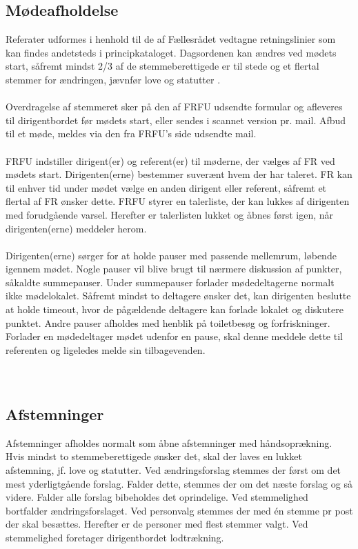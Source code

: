 \subsection{Mødeafholdelse}
Referater udformes i henhold til de af Fællesrådet vedtagne retningslinier som kan findes andetsteds i principkataloget.
Dagsordenen kan ændres ved mødets start, såfremt mindst 2/3 af de stemmeberettigede er til stede og et flertal stemmer
for ændringen, jævnfør love og statutter .
\\
\\
Overdragelse af stemmeret sker på den af FRFU udsendte formular og afleveres til dirigentbordet før mødets start, eller sendes i scannet version pr. mail. Afbud til et møde, meldes via den fra FRFU’s side udsendte mail.
\\
\\
FRFU indstiller dirigent(er) og referent(er) til møderne, der vælges af FR ved mødets start. Dirigenten(erne) bestemmer
suverænt hvem der har taleret. FR kan til enhver tid under mødet vælge en anden dirigent eller referent, såfremt et
flertal af FR ønsker dette. FRFU styrer en talerliste, der kan lukkes af dirigenten med forudgående varsel. Herefter er
talerlisten lukket og åbnes først igen, når dirigenten(erne) meddeler herom.
\\
\\
Dirigenten(erne) sørger for at holde pauser med passende mellemrum, løbende igennem mødet. Nogle pauser vil blive
brugt til nærmere diskussion af punkter, såkaldte summepauser. Under summepauser forlader mødedeltagerne normalt
ikke mødelokalet. Såfremt mindst to deltagere ønsker det, kan dirigenten beslutte at holde timeout, hvor de pågældende
deltagere kan forlade lokalet og diskutere punktet. Andre pauser afholdes med henblik på toiletbesøg og forfriskninger.
Forlader en mødedeltager mødet udenfor en pause, skal denne meddele dette til referenten og ligeledes melde sin
tilbagevenden.
\\
\\
\\

\subsection{Afstemninger}
Afstemninger afholdes normalt som åbne afstemninger med håndsoprækning. Hvis mindst to stemmeberettigede ønsker
det, skal der laves en lukket afstemning, jf. love og statutter.
Ved ændringsforslag stemmes der først om det mest yderligtgående forslag. Falder dette, stemmes der om det næste
forslag og så videre. Falder alle forslag bibeholdes det oprindelige. Ved stemmelighed bortfalder ændringsforslaget.
Ved personvalg stemmes der med én stemme pr post der skal besættes. Herefter er de personer med flest stemmer valgt.
Ved stemmelighed foretager dirigentbordet lodtrækning.
